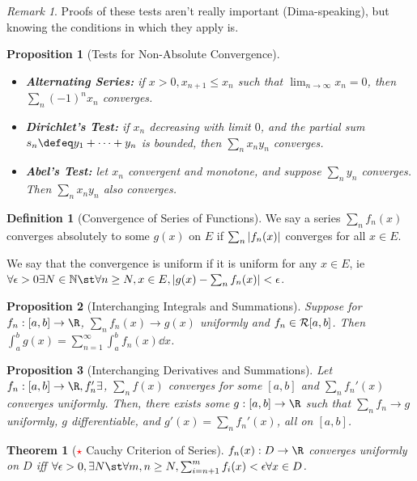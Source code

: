 \documentclass[12pt, oneside]{article}
\newcommand*{\important}{\textcolor{red}{$\star$} }
\theoremstyle{definition}
\newtheorem{defn}{Definition}
\theoremstyle{plain}
\newtheorem{thm}{Theorem}
\newtheorem{prop}{Proposition}
\theoremstyle{remark}
\newtheorem{remark}{Remark}
\begin{document}
\begin{remark}
  Proofs of these tests aren't really important (Dima-speaking), but knowing the conditions in which they apply is.
\end{remark}
\begin{prop}[Tests for Non-Absolute Convergence]
  \begin{itemize}
    \item \textbf{Alternating Series:} if $x > 0, x_{n+1} \leq x_n$ such that $\lim_{n \to \infty} x_n = 0$, then $\sum_{n} (-1)^n x_n$ converges.
    \item \textbf{Dirichlet's Test:} if $x_n$ decreasing with limit $0$, and the partial sum $s_n \defeq y_1 + \cdots + y_n$ is bounded, then $\sum_{n} x_n y_n$ converges.
    \item \textbf{Abel's Test:} let $x_n$ convergent and monotone, and suppose $\sum_{n} y_n$ converges. Then $\sum_n x_n y_n$ also converges.
  \end{itemize}
\end{prop}

\begin{defn}[Convergence of Series of Functions]
  We say a series $\sum_n f_n(x)$ converges absolutely to some $g(x)$ on $E$ if $\sum_n \abs{f_n(x)}$ converges for all $x \in E$.

  We say that the convergence is uniform if it is uniform for any $x \in E$, ie $\forall \epsilon > 0 \exists N \in \mathbb{N} \st \forall n \geq N, x \in E, \abs{g(x)- \sum_n f_n(x)} < \epsilon$.
\end{defn}

\begin{prop}[Interchanging Integrals and Summations]
  Suppose for $f_n : [a, b] \to \R$, $\sum_n f_n(x) \to g(x)$ uniformly and $f_n \in \mathcal{R}[a, b]$. Then $\int_a^b g(x) = \sum_{n=1}^\infty \int_a^b f_n(x) \dd{x}$.
\end{prop}

\begin{prop}[Interchanging Derivatives and Summations]
  Let $f_n : [a, b] \to \R, f_n' \exists$, $\sum_{n}f(x)$ converges for some $[a, b]$ and $\sum_n f_n'(x)$ converges uniformly. Then, there exists some $g: [a, b] \to \R$ such that $\sum_n f_n \to g$ uniformly, $g$ differentiable, and $g'(x) = \sum_n f_n'(x)$, all on $[a, b]$.
\end{prop}

\begin{thm}[\important Cauchy Criterion of Series]
  $f_n(x) : D \to \R$ converges uniformly on $D$ iff $\forall \epsilon > 0, \exists N \st \forall m,n \geq N, \sum_{i=n+1}^m f_i(x) < \epsilon \forall x \in D$.
\end{thm}
\end{document}
